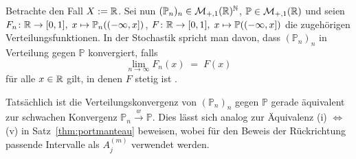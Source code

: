 \documentclass[../main/main.tex]{subfiles}
\begin{document}
		\begin{Bemerkung}[Verteilungskonvergenz]
		Betrachte den Fall $X := \mathbb{R}$. Sei nun $(\mathbb{P}_n)_n \in \mathcal{M}_{+,1}(\mathbb{R})^{\mathbb{N}}$,  $\mathbb{P} \in \mathcal{M}_{+,1}(\mathbb{R})$ und seien $F_n \colon \mathbb{R} \to [0, 1], \; x \mapsto \mathbb{P}_n((-\infty, x]) $, $F \colon \mathbb{R} \to [0, 1], \; x \mapsto \mathbb{P}((-\infty, x]) $ die zugehörigen Verteilungsfunktionen. In der Stochastik spricht man davon, dass $(\mathbb{P}_n)_n$ in Verteilung gegen $\mathbb{P}$ konvergiert, falls 
		\[ \lim_{n \to \infty} F_n(x) \; = \; F(x) \]
		für alle $x \in \mathbb{R}$ gilt, in denen $F$ stetig ist \cite[Definition 6.1]{Henze.2016}. 
		
		Tatsächlich ist die Verteilungskonvergenz von $(\mathbb{P}_n)_n$ gegen $\mathbb{P}$ gerade äquivalent zur schwachen Konvergenz $\mathbb{P}_n \xrightarrow{w} \mathbb{P}$. Dies lässt sich analog zur Äquivalenz (i) $\Leftrightarrow$ (v) in Satz~\ref{thm:portmanteau} beweisen, wobei für den Beweis der Rückrichtung passende Intervalle als $A_j^{(m)}$ verwendet werden.
	\end{Bemerkung}
	
\end{document}
